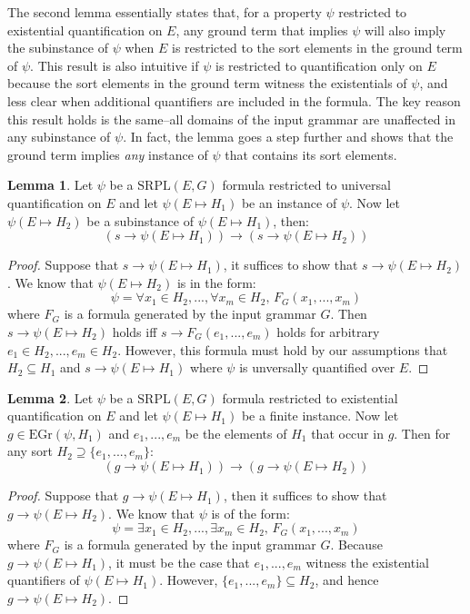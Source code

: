 \documentclass[12pt]{article}
\theoremstyle{definition}
\newtheorem{lemma}{Lemma}
\theoremstyle{remark}
\newcommand{\gr}{\text{EGr}}
\newcommand{\SRPL}{\text{SRPL}}
\begin{document}
The second lemma essentially states that, for a property $\psi$ restricted to existential quantification on $E$, any ground term that implies $\psi$ will also imply the subinstance of $\psi$ when $E$ is restricted to the sort elements in the ground term of $\psi$.  This result is also intuitive if $\psi$ is restricted to quantification only on $E$ because the sort elements in the ground term witness the existentials of $\psi$, and less clear when additional quantifiers are included in the formula.  The key reason this result holds is the same--all domains of the input grammar are unaffected in any subinstance of $\psi$.  In fact, the lemma goes a step further and shows that the ground term implies \textit{any} instance of $\psi$ that contains its sort elements.

\begin{lemma}
  \label{lem:forall-lower}
  Let $\psi$ be a $\SRPL(E,G)$ formula restricted to universal quantification on $E$ and let $\psi(E \mapsto H_1)$ be an instance of $\psi$.  Now let $\psi(E \mapsto H_2)$ be a subinstance of $\psi(E \mapsto H_1)$, then:
  $$(s \rightarrow \psi(E \mapsto H_1)) \rightarrow (s \rightarrow \psi(E \mapsto H_2))$$
\end{lemma}
\begin{proof}
  Suppose that $s \rightarrow \psi(E \mapsto H_1)$, it suffices to show that $s \rightarrow \psi(E \mapsto H_2)$.  We know that $\psi(E \mapsto H_2)$ is in the form:
  $$\psi = \forall x_1 \in H_2,...,\forall x_m \in H_2, \, F_G(x_1,...,x_m)$$
  where $F_G$ is a formula generated by the input grammar $G$.  Then $s \rightarrow \psi(E \mapsto H_2)$ holds iff $s \rightarrow F_G(e_1,...,e_m)$ holds for arbitrary $e_1 \in H_2,...,e_m \in H_2$.  However, this formula must hold by our assumptions that $H_2 \subseteq H_1$ and $s \rightarrow \psi(E \mapsto H_1)$ where $\psi$ is unversally quantified over $E$.
\end{proof}

\begin{lemma}
  \label{lem:exists-lower}
  Let $\psi$ be a $\SRPL(E,G)$ formula restricted to existential quantification on $E$ and let $\psi(E \mapsto H_1)$ be a finite instance.  Now let $g \in \gr(\psi,H_1)$ and $e_1,...,e_m$ be the elements of $H_1$ that occur in $g$.  Then for any sort $H_2 \supseteq \{e_1,...,e_m\}$:
  $$(g \rightarrow \psi(E \mapsto H_1)) \rightarrow (g \rightarrow \psi(E \mapsto H_2))$$
\end{lemma}
\begin{proof}
  Suppose that $g \rightarrow \psi(E \mapsto H_1)$, then it suffices to show that $g \rightarrow \psi(E \mapsto H_2)$.  We know that $\psi$ is of the form:
  $$\psi = \exists x_1 \in H_2,...,\exists x_m \in H_2, \, F_G(x_1,...,x_m)$$
  where $F_G$ is a formula generated by the input grammar $G$.  Because $g \rightarrow \psi(E \mapsto H_1)$, it must be the case that $e_1,...,e_m$ witness the existential quantifiers of $\psi(E \mapsto H_1)$.  However, $\{e_1,...,e_m\} \subseteq H_2$, and hence $g \rightarrow \psi(E \mapsto H_2)$.
\end{proof}
\end{document}
